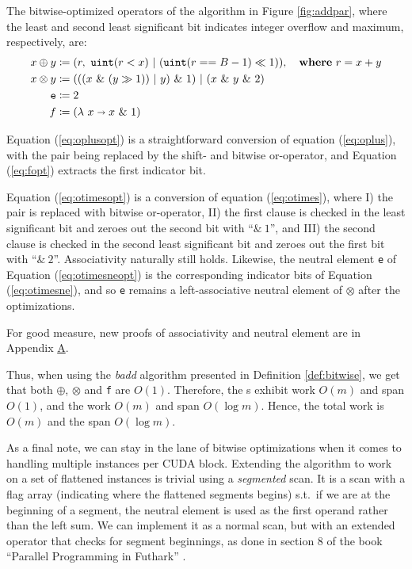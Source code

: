 \begin{definition}\label{def:bitwise}
  The bitwise-optimized operators of the algorithm in Figure \ref{fig:addpar},
  where the least and second least significant bit indicates integer overflow
  and maximum, respectively, are:
\begin{align}
  \label{eq:oplusopt}
  x \oplus y &\coloneq (r,~\mathtt{uint}(r < x)~|~(\mathtt{uint}(r == B-1) \ll 1)),\quad\textbf{where}~r = x + y \\
  \label{eq:otimesopt}
  x \otimes y &\coloneq (((x~\&~(y \gg 1))~|~y)~\&~1)~|~(x~\&~y~\&~2)\\
  \label{eq:otimesneopt}
  \mathtt{e} &\coloneq 2\\
  \label{eq:fopt}
  f &\coloneq (\lambda~x \shortrightarrow x~\&~1)
\end{align}
\end{definition}

Equation (\ref{eq:oplusopt}) is a straightforward conversion of equation
(\ref{eq:oplus}), with the pair being replaced by the shift- and bitwise
or-operator, and Equation (\ref{eq:fopt}) extracts the first indicator bit.

Equation (\ref{eq:otimesopt}) is a conversion of equation (\ref{eq:otimes}),
where I) the pair is replaced with bitwise or-operator, II) the first clause is
checked in the least significant bit and zeroes out the second bit with
``$\&~1$'', and III) the second clause is checked in the second least
significant bit and zeroes out the first bit with ``$\&~2$''. Associativity
naturally still holds. Likewise, the neutral element \texttt{e} of Equation
(\ref{eq:otimesneopt}) is the corresponding indicator bits of Equation
(\ref{eq:otimesne}), and so \texttt{e} remains a left-associative neutral
element of $\otimes$ after the optimizations.

For good measure, new proofs of associativity and neutral element are in
Appendix \hyperref[app:A]{A}.

Thus, when using the \textit{badd} algorithm presented in Definition
\ref{def:bitwise}, we get that both $\oplus$, $\otimes$ and \texttt{f} are
$O(1)$. Therefore, the s exhibit work $O(m)$ and span $O(1)$, and the
 work $O(m)$ and span $O(\log m)$. Hence, the total work is $O(m)$ and
the span $O(\log m)$.

As a final note, we can stay in the lane of bitwise optimizations when it comes
to handling multiple instances per CUDA block. Extending the algorithm to work
on a set of flattened instances is trivial using a \textit{segmented} scan. It
is a scan with a flag array (indicating where the flattened segments begins)
s.t.\ if we are at the beginning of a segment, the neutral element is used as the
first operand rather than the left sum.  We can implement it as a normal scan,
but with an extended operator that checks for segment beginnings, as done in
section 8 of the book ``Parallel Programming in Futhark''
\cite{ParallelProgrammingInFuthark}.

